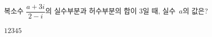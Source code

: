 복소수 $\dfrac{a+3i}{2-i}$의 실수부분과 허수부분의 합이 $3$일 때, 실수~$a$의 값은?
\begin{choices32}{$1$}{$2$}{$3$}{$4$}{$5$}\end{choices32}
